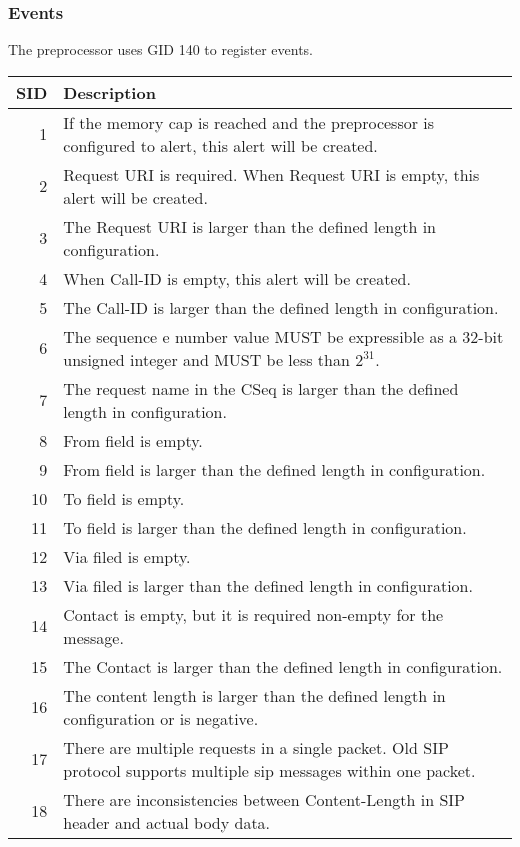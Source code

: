 \documentclass[english]{report}
\begin{document}
\subsubsection{Events}
The preprocessor uses GID 140 to register events.
\begin{longtable}{|r|p{13.5cm}|}

\hline
SID & Description\\
\hline
 1  & If the memory cap is reached and the preprocessor is configured to alert, 
     this alert will be created. \\
\hline
 2  & Request URI is required. When Request URI is empty, this alert will be created. \\
\hline
 3  & The Request URI is larger than the defined length in configuration.\\
\hline
 4  & When Call-ID is empty, this alert will be created.\\
\hline
 5  & The Call-ID is larger than the defined length in configuration.\\
\hline
 6  & The sequence e number value MUST be expressible as a 32-bit unsigned integer
     and MUST be less than $2^{31}$.\\
\hline
 7  & The request name in the CSeq is larger than the defined length in configuration.\\
\hline
 8  & From field is empty.\\
\hline
 9  & From field is larger than the defined length in configuration.\\
\hline
 10 & To field is empty.\\
\hline
 11 & To field is larger than the defined length in configuration.\\
\hline
 12 & Via filed is empty.\\
\hline
 13 & Via filed is larger than the defined length in configuration.\\
\hline
 14 & Contact is empty, but it is required non-empty for the message.\\ 
\hline
 15 & The Contact is larger than the defined length in configuration. \\
\hline
 16 & The content length is larger than the defined length in configuration or is negative. \\
\hline
 17 & There are multiple requests in a single packet. Old SIP protocol supports
      multiple sip messages within one packet.\\
\hline
 18 & There are inconsistencies between Content-Length in SIP header and 
      actual body data.\\

\end{longtable}
\end{document}
